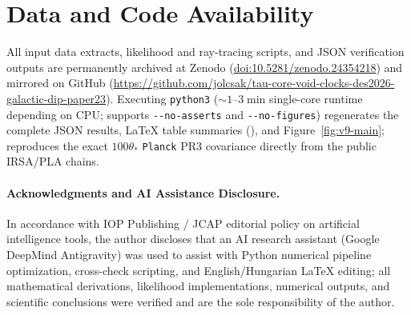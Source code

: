 \documentclass[11pt,a4paper]{article}
\begin{document}
\section*{Data and Code Availability}
{\sloppy All input data extracts, likelihood and ray-tracing scripts, and JSON verification outputs are permanently archived at Zenodo (\href{https://doi.org/10.5281/zenodo.24354218}{doi:10.5281/zenodo.24354218}) and mirrored on GitHub (\url{https://github.com/jolcsak/tau-core-void-clocks-des2026-galactic-dip-paper23}). Executing \texttt{python3}  ($\sim 1\text{--}3\;\mathrm{min}$ single-core runtime depending on CPU; supports \texttt{-{}-no-asserts} and \texttt{-{}-no-figures}) regenerates the complete JSON results, LaTeX table summaries (), and Figure~\ref{fig:v9-main};  reproduces the exact $100\theta_*$ \texttt{Planck} PR3 covariance directly from the public IRSA/PLA chains.\par}

\paragraph{Acknowledgments and AI Assistance Disclosure.} In accordance with IOP Publishing / JCAP editorial policy on artificial intelligence tools, the author discloses that an AI research assistant (Google DeepMind Antigravity) was used to assist with Python numerical pipeline optimization, cross-check scripting, and English/Hungarian LaTeX editing; all mathematical derivations, likelihood implementations, numerical outputs, and scientific conclusions were verified and are the sole responsibility of the author.
\end{document}
